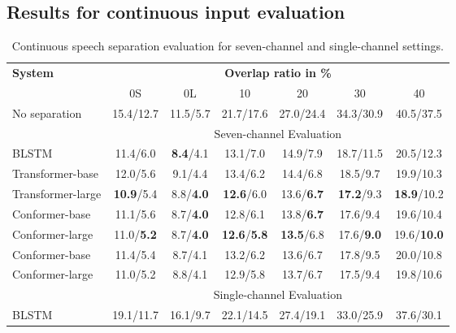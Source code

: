 \documentclass{article}
\begin{document}
	


	


	
	\subsection{Results for continuous input evaluation}
	
	\begin{table*}[!t]
		\centering
		
		\caption{ Continuous speech separation evaluation for seven-channel and single-channel settings. }
		\label{tab:7ch_cont_result}
		
		\begin{tabular}{l|cccccc}
			\toprule \hline
			\multirow{2}{*}{\textbf{System}} &
			\multicolumn{6}{c}{\textbf{Overlap ratio in \%}} \\ &
			0S & 0L & 10 & 20 & 30 & 40   \\ 
			\hline
			No separation \cite{chen2020continuous} & 15.4/12.7 & 11.5/5.7 & 21.7/17.6 & 27.0/24.4 & 34.3/30.9 & 40.5/37.5 \\\hline
			&   \multicolumn{6}{c}{Seven-channel Evaluation} \\ 
			\hline
BLSTM & 11.4/6.0 & \textbf{8.4}/4.1 & 13.1/7.0 & 14.9/7.9 & 18.7/11.5 & 20.5/12.3 \\ 
Transformer-base & 12.0/5.6 & 9.1/4.4 & 13.4/6.2 & 14.4/6.8 & 18.5/9.7 & 19.9/10.3 \\					
			Transformer-large & \textbf{10.9}/5.4 & 8.8/\textbf{4.0} & \textbf{12.6}/6.0 & 13.6/\textbf{6.7} & \textbf{17.2}/9.3 & \textbf{18.9}/10.2 \\
			
			Conformer-base & 11.1/5.6 & 8.7/\textbf{4.0} & 12.8/6.1 & 13.8/\textbf{6.7} & 17.6/9.4 & 19.6/10.4 \\
			Conformer-large & 11.0/\textbf{5.2} & 8.7/\textbf{4.0} & \textbf{12.6}/\textbf{5.8} & \textbf{13.5}/6.8 & 17.6/\textbf{9.0} & 19.6/\textbf{10.0} \\ 
Conformer-base & 11.4/5.4 & 8.7/4.1 & 13.2/6.2 & 13.6/6.7 & 17.8/9.5 & 20.0/10.8 \\
			Conformer-large &  11.0/5.2 & 8.8/4.1 & 12.9/5.8 & 13.7/6.7 & 17.5/9.4 & 19.8/10.6\\ \hline
			&   \multicolumn{6}{c}{Single-channel Evaluation}  \\ \hline
			
			BLSTM &  19.1/11.7 & 16.1/9.7 & 22.1/14.5 & 27.4/19.1 & 33.0/25.9 & 37.6/30.1 \\
			

\end{tabular}
\end{table*}
\end{document}
